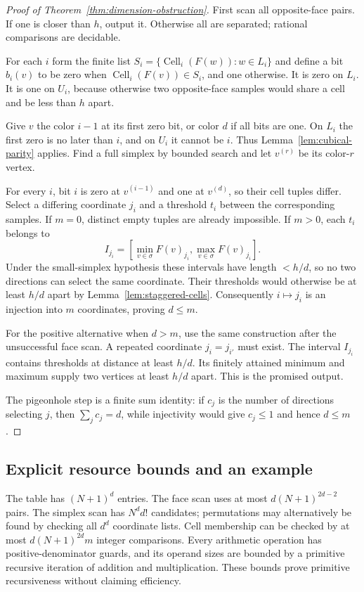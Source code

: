 \begin{proof}[Proof of Theorem~\ref{thm:dimension-obstruction}]
First scan all opposite-face pairs. If one is closer than $h$, output it. Otherwise all are separated; rational comparisons are decidable.

For each $i$ form the finite list
$S_i=\{\operatorname{Cell}_i(F(w)):w\in L_i\}$ and define a bit $b_i(v)$ to be zero when $\operatorname{Cell}_i(F(v))\in S_i$, and one otherwise. It is zero on $L_i$. It is one on $U_i$, because otherwise two opposite-face samples would share a cell and be less than $h$ apart.

Give $v$ the color $i-1$ at its first zero bit, or color $d$ if all bits are one. On $L_i$ the first zero is no later than $i$, and on $U_i$ it cannot be $i$. Thus Lemma~\ref{lem:cubical-parity} applies. Find a full simplex by bounded search and let $v^{(r)}$ be its color-$r$ vertex.

For every $i$, bit $i$ is zero at $v^{(i-1)}$ and one at $v^{(d)}$, so their cell tuples differ. Select a differing coordinate $j_i$ and a threshold $t_i$ between the corresponding samples. If $m=0$, distinct empty tuples are already impossible. If $m>0$, each $t_i$ belongs to
\[
 I_{j_i}
 =\left[\min_{v\in\sigma}F(v)_{j_i},
          \max_{v\in\sigma}F(v)_{j_i}\right].
\]
Under the small-simplex hypothesis these intervals have length $<h/d$, so no two directions can select the same coordinate. Their thresholds would otherwise be at least $h/d$ apart by Lemma~\ref{lem:staggered-cells}. Consequently $i\mapsto j_i$ is an injection into $m$ coordinates, proving $d\leq m$.

For the positive alternative when $d>m$, use the same construction after the unsuccessful face scan. A repeated coordinate $j_i=j_{i'}$ must exist. The interval $I_{j_i}$ contains thresholds at distance at least $h/d$. Its finitely attained minimum and maximum supply two vertices at least $h/d$ apart. This is the promised output.

The pigeonhole step is a finite sum identity: if $c_j$ is the number of directions selecting $j$, then $\sum_jc_j=d$, while injectivity would give $c_j\leq1$ and hence $d\leq m$.
\end{proof}

\subsection{Explicit resource bounds and an example}

The table has $(N+1)^d$ entries. The face scan uses at most $d(N+1)^{2d-2}$ pairs. The simplex scan has $N^d d!$ candidates; permutations may alternatively be found by checking all $d^d$ coordinate lists. Cell membership can be checked by at most $d(N+1)^{2d}m$ integer comparisons. Every arithmetic operation has positive-denominator guards, and its operand sizes are bounded by a primitive recursive iteration of addition and multiplication. These bounds prove primitive recursiveness without claiming efficiency.


